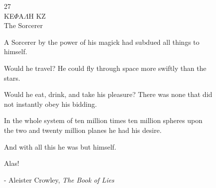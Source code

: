 
\begin{figure}
\vspace{50pt}
\begin{center}
27\\
KE$\Phi$A$\Lambda$H KZ\\
The Sorcerer
\end{center}

\begin{center}

\parbox{250pt}{

\begin{hangparas}{2em}{1}A Sorcerer by the power of his magick had subdued all things to himself.

Would he travel? He could fly through space more swiftly than the stars.

Would he eat, drink, and take his pleasure? There was none that did not
instantly obey his bidding.

In the whole system of ten million times ten million spheres upon the two and
twenty million planes he had his desire.

And with all this he was but himself.

Alas!
\end{hangparas}


\begin{center}
- Aleister Crowley, \emph{The Book of Lies}
\end{center}

}

\end{center}
\end{figure}